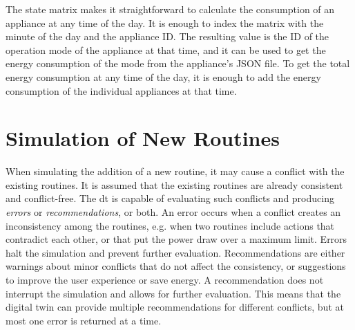 The state matrix makes it straightforward to calculate the consumption of an appliance at any time of the day. It is enough to index the matrix with the minute of the day and the appliance ID. The resulting value is the ID of the operation mode of the appliance at that time, and it can be used to get the energy consumption of the mode from the appliance's JSON file. To get the total energy consumption at any time of the day, it is enough to add the energy consumption of the individual appliances at that time.

\section{Simulation of New Routines}\label{sec:simulation}

When simulating the addition of a new routine, it may cause a conflict with the existing routines. It is assumed that the existing routines are already consistent and conflict-free. The \acrshort{dt} is capable of evaluating such conflicts and producing \textit{errors} or \textit{recommendations}, or both. An error occurs when a conflict creates an inconsistency among the routines, e.g. when two routines include actions that contradict each other, or that put the power draw over a maximum limit. Errors halt the simulation and prevent further evaluation. Recommendations are either warnings about minor conflicts that do not affect the consistency, or suggestions to improve the user experience or save energy. A recommendation does not interrupt the simulation and allows for further evaluation. This means that the digital twin can provide multiple recommendations for different conflicts, but at most one error is returned at a time.

